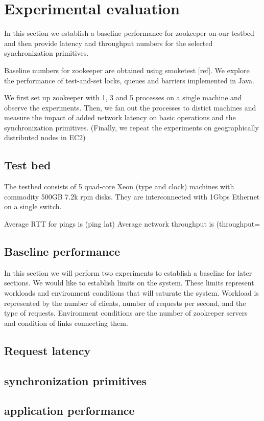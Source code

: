 \section{Experimental evaluation}\label{sec:eval}
In this section we establish a baseline performance for zookeeper on our
testbed and then provide latency and throughput numbers for the selected
synchronization primitives.

Baseline numbers for zookeeper are obtained using smoketest [ref]. We explore
the performance of test-and-set locks, queues and barriers implemented in Java.

We first set up zookeeper with 1, 3 and 5 processes on a single machine and
observe the experiments. Then, we fan out the processes to distict machines and
measure the impact of added network latency on basic operations and the
synchronization primitives. (Finally, we repeat the experiments on
geographically distributed nodes in EC2)

\subsection{Test bed}
The testbed consists of 5 quad-core Xeon (type and clock) machines with commodity 500GB 7.2k rpm disks. They are interconnected with 1Gbps Ethernet on a single switch.

Average RTT for pings is (ping lat)
Average network throughput is (throughput=

\subsection{Baseline performance}
 In this section we will perform two experiments to establish a baseline for later sections. We would like to establish limits on the system. These limits represent workloads and environment conditions that will saturate the system. Workload is represented by the number of clients, number of requests per second, and the type of requests. Environment conditions are the number of zookeeper servers and condition of links connecting them.



\subsection{Request latency}

\subsection{synchronization primitives}

\subsection{application performance}

